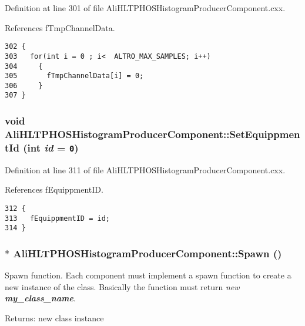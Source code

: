 Definition at line 301 of file Ali\-HLTPHOSHistogram\-Producer\-Component.cxx.

References f\-Tmp\-Channel\-Data.

\footnotesize\begin{verbatim}302 {
303   for(int i = 0 ; i<  ALTRO_MAX_SAMPLES; i++)
304     {
305       fTmpChannelData[i] = 0;
306     }
307 }
\end{verbatim}\normalsize 


\subsubsection{\setlength{\rightskip}{0pt plus 5cm}void Ali\-HLTPHOSHistogram\-Producer\-Component::Set\-Equippment\-Id (int {\em id} = {\tt 0})}\label{classAliHLTPHOSHistogramProducerComponent_a14}




Definition at line 311 of file Ali\-HLTPHOSHistogram\-Producer\-Component.cxx.

References f\-Equippment\-ID.

\footnotesize\begin{verbatim}312 {
313   fEquippmentID = id;
314 }
\end{verbatim}\normalsize 


\subsubsection{ $\ast$ Ali\-HLTPHOSHistogram\-Producer\-Component::Spawn ()\hspace{0.3cm}{\tt  [virtual]}}\label{classAliHLTPHOSHistogramProducerComponent_a15}


Spawn function. Each component must implement a spawn function to create a new instance of the class. Basically the function must return {\em new {\bf my\_\-class\_\-name}\/}. \begin{Desc}
\item[Returns:]new class instance \end{Desc}


